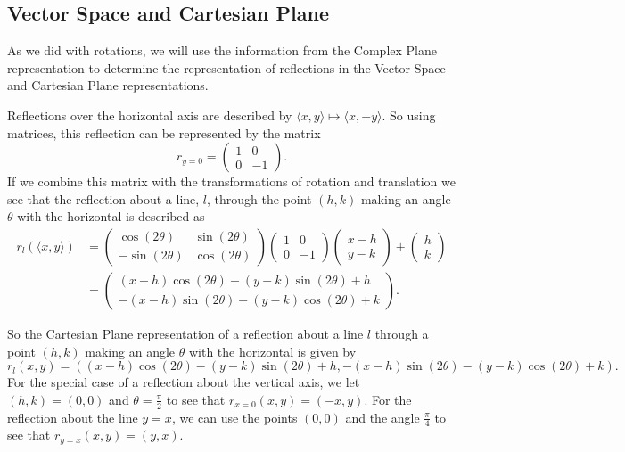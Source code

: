 \documentclass[
]{book}
\theoremstyle{definition}
\theoremstyle{definition}
\theoremstyle{definition}
\theoremstyle{definition}
\theoremstyle{remark}
\begin{document}
\hypertarget{vector-space-and-cartesian-plane}{%
\subsection{Vector Space and Cartesian Plane}\label{vector-space-and-cartesian-plane}}

As we did with rotations, we will use the information from the Complex Plane representation to determine the representation of reflections in the Vector Space and Cartesian Plane representations.

Reflections over the horizontal axis are described by \(\langle x,y \rangle \mapsto \langle x,-y\rangle\). So using matrices, this reflection can be represented by the matrix \[r_{y=0} = \begin{pmatrix} 1 & 0 \\ 0 & -1 \end{pmatrix}.\] If we combine this matrix with the transformations of rotation and translation we see that the reflection about a line, \(l\), through the point \((h,k)\) making an angle \(\theta\) with the horizontal is described as
\begin{align*}
r_l (\langle x,y\rangle ) &= \begin{pmatrix} \cos(2\theta) & \sin(2\theta) \\ -\sin(2\theta) & \cos(2\theta) \end{pmatrix} \begin{pmatrix} 1 & 0 \\ 0 & -1 \end{pmatrix} \begin{pmatrix} x-h \\ y-k \end{pmatrix}  + \begin{pmatrix} h \\ k \end{pmatrix} \\
&= \begin{pmatrix} (x-h) \cos(2\theta) - (y-k)\sin(2\theta) +h \\ -(x-h) \sin(2\theta) - (y-k)\cos(2\theta) +k \end{pmatrix} .\end{align*}

So the Cartesian Plane representation of a reflection about a line \(l\) through a point \((h,k)\) making an angle \(\theta\) with the horizontal is given by
\[r_{l} (x,y) = \left( (x-h) \cos(2\theta) - (y-k)\sin(2\theta) +h,   -(x-h) \sin(2\theta) - (y-k)\cos(2\theta) +k    \right) .\]
For the special case of a reflection about the vertical axis, we let \((h,k)=(0,0)\) and \(\theta=\frac{\pi}{2}\) to see that
\(r_{x=0} (x,y) = (-x,y)\). For the reflection about the line \(y=x\), we can use the points \((0,0)\) and the angle \(\frac{\pi}{4}\) to see that \(r_{y=x}(x,y) = (y,x)\).
\end{document}
